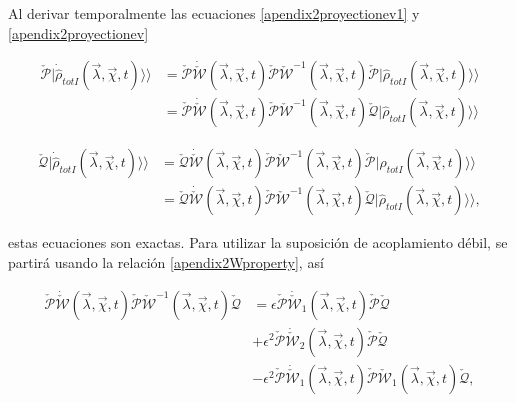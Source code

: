 \begin{appendixs}
Al derivar temporalmente las ecuaciones \ref{apendix2proyectionev1} y \ref{apendix2proyectionev} 

\begin{align*}
    \check{\mathcal{P}}|\dot{\hat{\rho}}_{totI}(\vec{\lambda},\vec{\chi},t) \rangle \rangle & = \check{\mathcal{P}}\dot{\check{\mathcal{W}}}(\vec{\lambda},\vec{\chi},t)\check{\mathcal{P}}\check{\mathcal{W}}^{-1}(\vec{\lambda},\vec{\chi},t)\check{\mathcal{P}}|\hat{\rho}_{totI}(\vec{\lambda},\vec{\chi},t)\rangle \rangle \\
     & = \check{\mathcal{P}}\dot{\check{\mathcal{W}}}(\vec{\lambda},\vec{\chi},t)\check{\mathcal{P}}\check{\mathcal{W}}^{-1}(\vec{\lambda},\vec{\chi},t)\check{\mathcal{Q}}|\hat{\rho}_{totI}(\vec{\lambda},\vec{\chi},t)\rangle \rangle 
\end{align*}

\begin{align*}
    \check{\mathcal{Q}}|\dot{\hat{\rho}}_{totI}(\vec{\lambda},\vec{\chi},t) \rangle \rangle & = \check{\mathcal{Q}}\dot{\check{\mathcal{W}}}(\vec{\lambda},\vec{\chi},t)\check{\mathcal{P}}\check{\mathcal{W}}^{-1}(\vec{\lambda},\vec{\chi},t)\check{\mathcal{P}}|\hat{\rho}_{totI}(\vec{\lambda},\vec{\chi},t)\rangle \rangle \\
     & = \check{\mathcal{Q}}\dot{\check{\mathcal{W}}}(\vec{\lambda},\vec{\chi},t)\check{\mathcal{P}}\check{\mathcal{W}}^{-1}(\vec{\lambda},\vec{\chi},t)\check{\mathcal{Q}}|\hat{\rho}_{totI}(\vec{\lambda},\vec{\chi},t)\rangle \rangle, 
\end{align*}

estas ecuaciones son exactas. Para utilizar la suposición de acoplamiento débil, se partirá usando la relación \ref{apendix2Wproperty}, así

\begin{align*}
    \check{\mathcal{P}}\dot{\check{\mathcal{W}}}(\vec{\lambda},\vec{\chi},t)\check{\mathcal{P}}\check{\mathcal{W}}^{-1}(\vec{\lambda},\vec{\chi},t)\check{\mathcal{Q}} & = \epsilon \check{\mathcal{P}}\dot{\check{\mathcal{W}}}_{1}(\vec{\lambda},\vec{\chi},t) \check{\mathcal{P}}\check{\mathcal{Q}} \\
     & + \epsilon^{2} \check{\mathcal{P}}\dot{\check{\mathcal{W}}}_{2}(\vec{\lambda},\vec{\chi},t) \check{\mathcal{P}}\check{\mathcal{Q}} \\
     & - \epsilon^{2}\check{\mathcal{P}}\dot{\check{\mathcal{W}}}_{1}(\vec{\lambda},\vec{\chi},t)\check{\mathcal{P}} \check{\mathcal{W}}_{1}(\vec{\lambda},\vec{\chi},t)\check{\mathcal{Q}},
\end{align*}


\end{appendixs}
